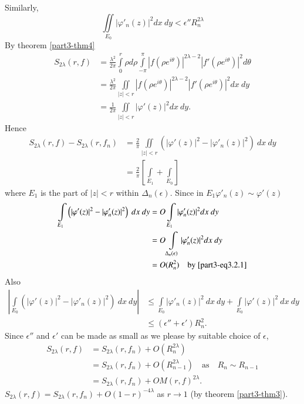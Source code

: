 Similarly,
$$
\iint\limits_{E_{0}}|\varphi'_{n}(z)|^{2}dx\ dy<\epsilon''R^{2\lambda}_{n}
$$
By theorem \ref{part3-thm4}
\begin{align*}
S_{2\lambda}(r,f) &= \frac{\lambda^{2}}{2\pi}\int\limits^{r}_{0}\rho
d\rho \int\limits^{\pi}_{-\pi}|f(\rho
e^{i\theta})|^{2\lambda-2}|f'(\rho e^{i\theta})|^{2}d\theta\\
&= \frac{\lambda^{2}}{2\pi}\iint\limits_{|z|<r}|f(\rho
e^{i\theta})|^{2\lambda-2}|f'(\rho e^{i\theta})|^{2}dx\ dy\\
&= \frac{1}{2\pi}\iint\limits_{|z|<r}|\varphi'(z)|^{2}dx\ dy.
\end{align*}\pageoriginale
Hence
\begin{align*}
S_{2\lambda}(r,f)-S_{2\lambda}(r,f_{n}) &=
\frac{2}{\pi}\iint\limits_{|z|<r}
\left(|\varphi'(z)|^{2}-|\varphi'_{n}(z)|^{2} \right) \ dx\ dy\\
&= \frac{2}{\pi}\left[\int\limits_{E_{1}}+\int\limits_{E_{0}}\right]
\end{align*}
where $E_{1}$ is the part of $|z|<r$ within
$\Delta_{n}(\epsilon)$. Since in $E_{1}\varphi'_{n}(z)\sim
\varphi'(z)$ 
\begin{align*}
\int\limits_{E_{1}}
\left(|\varphi'(z)|^{2}-|\varphi'_{n}(z)|^{2}\right) \ dx\ dy &=
O\int\limits_{E_{1}}|\varphi'_{n}(z)|^{2}dx\ dy\\
&= O\int\limits_{\Delta_{n}(\epsilon)}|\varphi'_{n}(z)|^{2}dx\ dy\\
&= O(R^{2}_{n})\quad\text{by \eqref{part3-eq3.2.1}}
\end{align*}
Also
\begin{align*}
|\int\limits_{E_{0}}\left(|\varphi'(z)|^{2}-|\varphi'_{n}(z)|^{2}
\right) \ dx\ dy | &\leq
\int\limits_{E_{0}}|\varphi'_{n}(z)|^{2} \ dx\ dy +
\int\limits_{E_{0}}|\varphi'(z)|^{2} \ dx\ dy\\ 
&\leq (\epsilon''+\epsilon')R^{2}_{n}.
\end{align*}
Since $\epsilon''$ and $\epsilon'$ can be made as small as we please
by suitable choice of $\epsilon$,
\begin{align*}
S_{2\lambda}(r,f) &=S_{2\lambda}(r,f_{n}) + O(R^{2\lambda}_{n})\\
&= S_{2\lambda}(r,f_{n})+ O(R^{2\lambda}_{n-1})\quad\text{as}\quad R_{n}\sim
R_{n-1}\\
&= S_{2\lambda}(r,f_{n}) + OM(r,f)^{2\lambda}.
\end{align*}\pageoriginale
\ie $S_{2\lambda}(r,f)=S_{2\lambda}(r,f_{n})+O(1-r)^{-4\lambda}$ as
$r\to 1$ (by theorem \ref{part3-thm3}).

